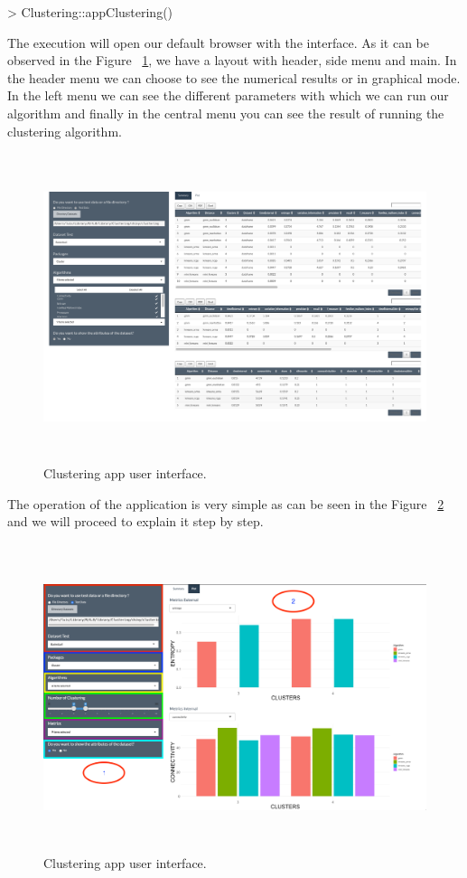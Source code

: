 \begin{Schunk}
\begin{Sinput}
> Clustering::appClustering()
\end{Sinput}
\end{Schunk}

The execution will open our default browser with the interface. As it can be observed in the Figure ~\ref{fig:layoutApp}, we have a layout with header, side menu and main. In the header menu we can choose to see the numerical results or in graphical mode. In the left menu we can see the different parameters with which we can run our algorithm and finally in the central menu you can see the result of running the clustering algorithm.

\begin{figure}[htbp]
  \centering
   \includegraphics[width=14cm, height=9cm]{img/app}
    \caption{Clustering app user interface.}
    \label{fig:layoutApp}%
\end{figure}

The operation of the application is very simple as can be seen in the Figure ~\ref{fig:layoutApp1} and we will proceed to explain it step by step.

\begin{figure}[htbp]
  \centering
   \includegraphics[width=14cm, height=9cm]{img/app1}
    \caption{Clustering app user interface.}
    \label{fig:layoutApp1}%
\end{figure}

